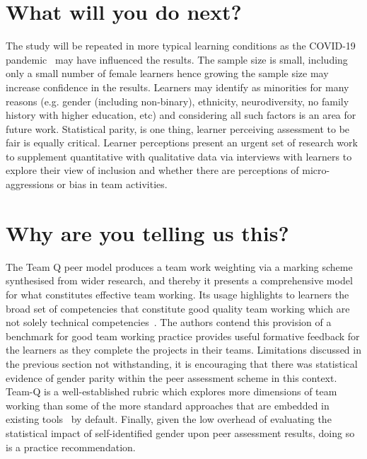 \documentclass[sigconf, anonymous=false]{acmart}
\begin{document}
\section{What will you do next?}
The study will be repeated in more typical learning conditions as the
COVID-19
pandemic~\cite{crick-et-al:ukicer2020,watermeyer-et-al:he2020,crick-et-ala:iticse2021}
may have influenced the results. The sample size is small, including
only a small number of female learners hence growing the sample size
may increase confidence in the results. Learners may identify as
minorities for many reasons (e.g. gender (including non-binary),
ethnicity, neurodiversity, no family history with higher education,
etc) and considering all such factors is an area for future
work. Statistical parity, is one thing, learner perceiving assessment
to be fair is equally critical. Learner perceptions present an urgent
set of research work to supplement quantitative with qualitative data
via interviews with learners to explore their view of inclusion and
whether there are perceptions of micro-aggressions or bias in team
activities.

\section{Why are you telling us this?}
The Team Q peer model produces a team work weighting via a marking
scheme synthesised from wider research, and thereby it presents a
comprehensive model for what constitutes effective team working. Its
usage highlights to learners the broad set of competencies that
constitute good quality team working which are not solely technical
competencies~\cite{Thomas2003,Crick2020,prickett-et-al:iticse2020,Mitchell2021}. The
authors contend this provision of a benchmark for good team working
practice provides useful formative feedback for the learners as they
complete the projects in their teams.  Limitations discussed in the
previous section not withstanding, it is encouraging that there was
statistical evidence of gender parity within the peer assessment
scheme in this context. Team-Q is a well-established rubric which
explores more dimensions of team working than some of the more
standard approaches that are embedded in existing
tools~\cite{WebPA,BuddyCheck,SparkPlus} by default. Finally, given the
low overhead of evaluating the statistical impact of self-identified
gender upon peer assessment results, doing so is a practice
recommendation.



\end{document}
